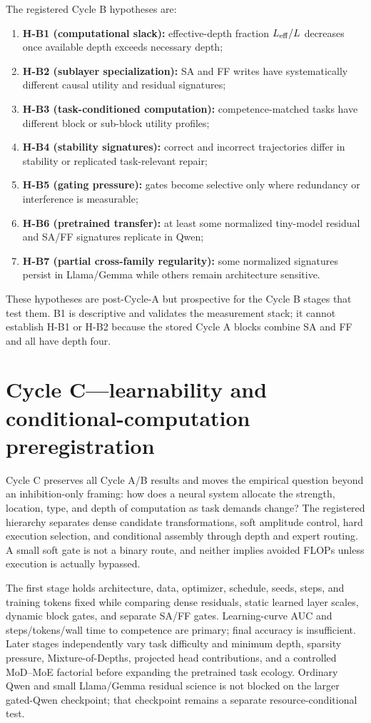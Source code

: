 \documentclass[10pt]{article}
\begin{document}
The registered Cycle B hypotheses are:
\begin{enumerate}[leftmargin=*]
\item \textbf{H-B1 (computational slack):} effective-depth fraction $L_{\rm eff}/L$ decreases once available depth exceeds necessary depth;
\item \textbf{H-B2 (sublayer specialization):} SA and FF writes have systematically different causal utility and residual signatures;
\item \textbf{H-B3 (task-conditioned computation):} competence-matched tasks have different block or sub-block utility profiles;
\item \textbf{H-B4 (stability signatures):} correct and incorrect trajectories differ in stability or replicated task-relevant repair;
\item \textbf{H-B5 (gating pressure):} gates become selective only where redundancy or interference is measurable;
\item \textbf{H-B6 (pretrained transfer):} at least some normalized tiny-model residual and SA/FF signatures replicate in Qwen;
\item \textbf{H-B7 (partial cross-family regularity):} some normalized signatures persist in Llama/Gemma while others remain architecture sensitive.
\end{enumerate}
These hypotheses are post-Cycle-A but prospective for the Cycle B stages that test them. B1 is descriptive and validates the measurement stack; it cannot establish H-B1 or H-B2 because the stored Cycle A blocks combine SA and FF and all have depth four.

\section{Cycle C---learnability and conditional-computation preregistration}
Cycle C preserves all Cycle A/B results and moves the empirical question beyond an inhibition-only framing: how does a neural system allocate the strength, location, type, and depth of computation as task demands change? The registered hierarchy separates dense candidate transformations, soft amplitude control, hard execution selection, and conditional assembly through depth and expert routing. A small soft gate is not a binary route, and neither implies avoided FLOPs unless execution is actually bypassed.

The first stage holds architecture, data, optimizer, schedule, seeds, steps, and training tokens fixed while comparing dense residuals, static learned layer scales, dynamic block gates, and separate SA/FF gates. Learning-curve AUC and steps/tokens/wall time to competence are primary; final accuracy is insufficient. Later stages independently vary task difficulty and minimum depth, sparsity pressure, Mixture-of-Depths, projected head contributions, and a controlled MoD--MoE factorial before expanding the pretrained task ecology. Ordinary Qwen and small Llama/Gemma residual science is not blocked on the larger gated-Qwen checkpoint; that checkpoint remains a separate resource-conditional test.
\end{document}
